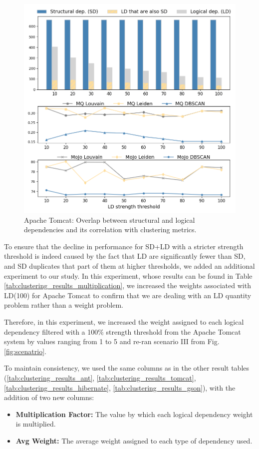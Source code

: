 \documentclass[12pt, a4paper, twoside]{report}
\begin{document}
\begin{figure}[t!]
\centering
\includegraphics[width=\columnwidth]{catalina_correlation.png}
\caption{Apache Tomcat: Overlap between structural and logical dependencies and its correlation with clustering metrics.}
\label{fig:catalina_correlation}
\end{figure}

To ensure that the decline in performance for SD+LD with a stricter strength threshold is indeed caused by the fact that LD are significantly fewer than SD, and SD duplicates that part of them at higher thresholds, we added an additional experiment to our study. In this experiment, whose results can be found in Table \ref{tab:clustering_results_multiplication}, we increased the weights associated with LD(100) for Apache Tomcat to confirm that we are dealing with an LD quantity problem rather than a weight problem.

Therefore, in this experiment, we increased the weight assigned to each logical dependency filtered with a 100\% strength threshold from the Apache Tomcat system by values ranging from 1 to 5 and re-ran scenario III from Fig. \ref{fig:scenatrio}.


To maintain consistency, we used the same columns as in the other result tables (\ref{tab:clustering_results_ant}, \ref{tab:clustering_results_tomcat}, \ref{tab:clustering_results_hibernate}, \ref{tab:clustering_results_gson}), with the addition of two new columns:
\begin{itemize}
\item \textbf{Multiplication Factor:} The value by which each logical dependency weight is multiplied.
\item \textbf{Avg Weight:} The average weight assigned to each type of dependency used.
\end{itemize}
\end{document}
